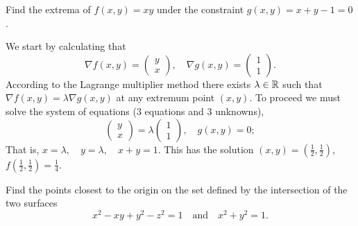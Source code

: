 \begin{task}
    Find the extrema of \(f(x,y) = xy\) under the constraint \(g(x,y) = x+y-1 =0\).
\end{task}

\begin{solution}
    We start by calculating that
    \[
        \nabla f(x,y) = \left(\begin{smallmatrix}
                y\\ x
            \end{smallmatrix}\right),
        \quad
        \nabla g(x,y) = \left(\begin{smallmatrix}
                1\\ 1
            \end{smallmatrix}\right).
    \]
    According to the Lagrange multiplier method there exists \(\lambda\in \mathbb{R}\) such that \(\nabla f(x,y) = \lambda \nabla g(x,y)\) at any extremum point \((x,y)\).
    To proceed we must solve the system of equations (3 equations and 3 unknowns),
    \[
        \left(\begin{smallmatrix}
                y\\ x
            \end{smallmatrix}\right)
        = \lambda \left(\begin{smallmatrix}
                1\\ 1
            \end{smallmatrix}\right),
        \quad g(x,y) =0;
    \]
    That is,
    \( x = \lambda, \quad
    y = \lambda, \quad
    x+y = 1
    \).
    This has the solution \((x,y) = (\frac{1}{2},\frac{1}{2})\), \(f(\frac{1}{2},\frac{1}{2})= \frac{1}{4}\).
\end{solution}



\begin{task}
    Find the points closest to the origin on the set defined by the intersection of the two surfaces
    \[
        x^2 - xy + y^2 - z^2 = 1
        \quad \text{and} \quad
        x^2 + y^2 = 1.
    \]
\end{task}

